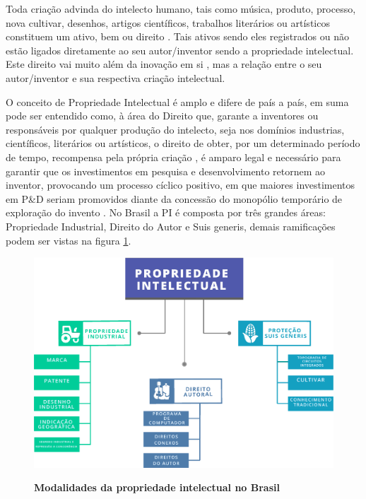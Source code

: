 Toda criação advinda do intelecto humano, tais como música, produto, processo, nova cultivar, desenhos, artigos científicos, trabalhos literários ou artísticos constituem um ativo, bem ou direito \cite{costa_interseccao_2011}. Tais ativos sendo eles registrados ou não estão ligados diretamente ao seu autor/inventor sendo a propriedade  intelectual. Este direito vai muito além da inovação em si \cite{wipo_tratado_1970}, mas a relação entre o seu autor/inventor e sua respectiva criação intelectual. 


O conceito de Propriedade Intelectual é amplo e difere de país a país, em suma pode ser entendido como, à área do Direito que, garante a inventores ou responsáveis por qualquer produção do intelecto, seja nos domínios industrias, científicos, literários ou artísticos, o direito de obter, por um determinado período de tempo, recompensa pela própria criação \cite{aspi_aspi_2019}, é amparo legal e necessário para garantir que os investimentos em pesquisa e desenvolvimento retornem ao inventor, provocando um processo cíclico positivo, em que maiores investimentos em P&D seriam promovidos diante da concessão do monopólio temporário de exploração do invento \cite{lima_sauglobal_2017}. No Brasil a PI é composta por três grandes áreas: Propriedade Industrial, Direito do Autor e Suis generis, demais ramificações podem ser vistas na figura \ref{figura_4}.


\begin{figure}[h!]
\centering
\caption{\textbf{Modalidades da propriedade intelectual no Brasil}}
\includegraphics[scale=0.75]{Imagens/propriedade_intelectual.png}
\label{figura_4}
\end{figure}


